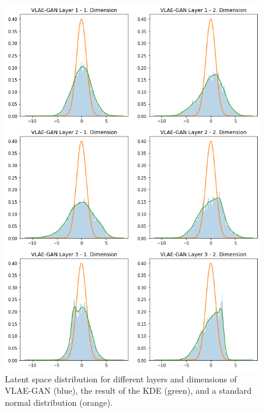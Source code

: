 \documentclass[11pt]{article}
\begin{document}
\begin{figure}[H]
\centering
\includegraphics[width=.8\textwidth]{images/generated_vs_true/vlae_gan_kde.png}
\caption[\ac{VLAE}-\ac{GAN} Estimated Latent Space Distribution]{Latent space distribution for different layers and dimensions of \ac{VLAE}-\ac{GAN} (blue), the result of the \ac{KDE} (green), and a standard normal distribution (orange).}
\end{figure}

\pagebreak
\end{document}
